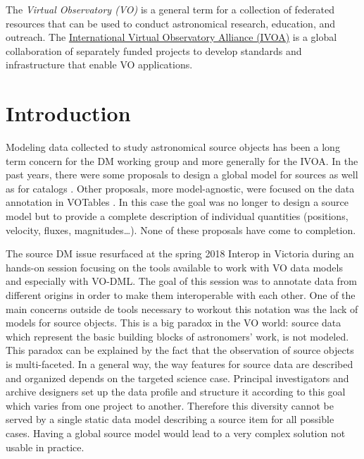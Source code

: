 \documentclass[11pt,a4paper]{ivoa}
\begin{document}
The \emph{Virtual Observatory (VO)} is a
general term for a collection of federated resources that can be used
to conduct astronomical research, education, and outreach.
The \href{http://www.ivoa.net}{International
Virtual Observatory Alliance (IVOA)} is a global
collaboration of separately funded projects to develop standards and
infrastructure that enable VO applications.


\section{Introduction}

Modeling data collected to study astronomical source objects has been a long term concern for the DM working group and more generally for the IVOA.
In the past years, there were some proposals to design a global model for sources \citep{wd:jesusdm} as well as for catalogs \citep{wd:catalog}.
Other proposals, more model-agnostic, were focused on the data annotation in VOTables \citep{note:stcvot} \citep{note:seb}. 
In this case the goal was no longer to design a source model but to provide a complete description of  individual quantities (positions, velocity, fluxes, magnitudes…).
None of these proposals have come to completion.

The source DM issue resurfaced at the spring 2018 Interop in Victoria during an hands-on session focusing on the tools available to work with VO data models and especially with VO-DML. 
The goal of this session was to annotate data from different origins in order to make them interoperable with each other.
One of the main concerns outside de tools necessary to workout this notation was the lack of models for source objects.
This is a big paradox in the VO world: source data which represent the basic building blocks of astronomers' work, is not modeled. 
This paradox can be explained by the fact that the observation of source objects is multi-faceted.
In a general way, the way features for source data are described and organized depends on the targeted science case. 
Principal investigators and archive designers set up the data profile and structure it according to this goal which varies from one project to another. 
Therefore this diversity cannot be served by a single static data model describing a source item for all possible cases.
Having a global source model would lead to a very complex solution not usable in practice.
\end{document}
